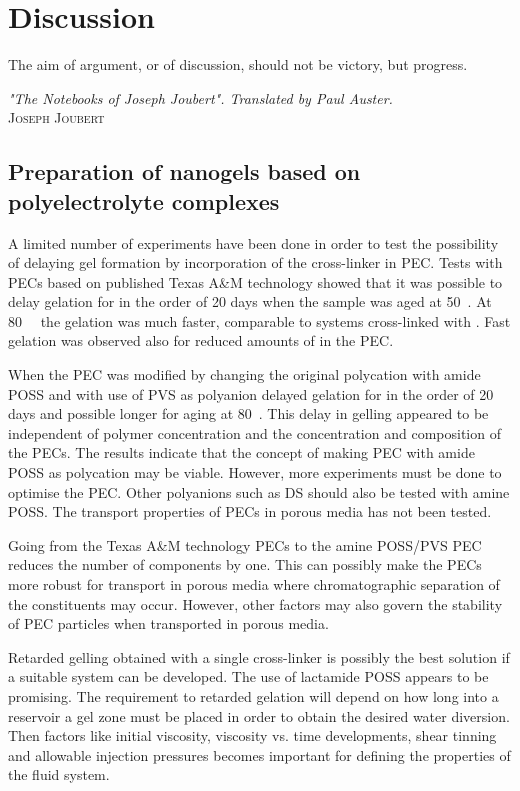 \chapter{Discussion} \label{chap:experimental}
\vspace*{\fill}
\epigraph{The aim of argument, or of discussion, should not be victory, but progress.}%
{\textit{"The Notebooks of Joseph Joubert". Translated by Paul Auster.}\\ \textsc{Joseph Joubert}}
\clearpage{\thispagestyle{empty}\cleardoublepage}
\section{Preparation of nanogels based on polyelectrolyte complexes}
A limited number of experiments have been done in order to test the possibility of delaying gel formation by incorporation of the cross-linker in PEC. Tests with PECs based on published Texas A\&M technology showed that it was possible to delay gelation for in the order of 20 days when the sample was aged at 50~\celsius. At 80~\celsius~ the gelation was much faster, comparable to systems cross-linked with . Fast gelation was observed also for reduced amounts of  in the PEC.

When the PEC was modified by changing the original polycation with amide POSS and with use of PVS as polyanion delayed gelation for in the order of 20 days and possible longer for aging at 80~\celsius. This delay in gelling appeared to be independent of polymer concentration and the concentration and composition of the PECs. The results indicate that the concept of making PEC with amide POSS as polycation may be viable. However, more experiments must be done to optimise the PEC. Other polyanions such as DS should also be tested with amine POSS. The transport properties of PECs in porous media has not been tested.

Going from the Texas A\&M technology PECs to the amine POSS/PVS PEC reduces the number of components by one. This can possibly make the PECs more robust for transport in porous media where chromatographic separation of the constituents may occur. However, other factors may also govern the stability of PEC particles when transported in porous media.

Retarded gelling obtained with a single cross-linker is possibly the best solution if a suitable system can be developed. The use of lactamide POSS appears to be promising. The requirement to retarded gelation will depend on how long into a reservoir a gel zone must be placed in order to obtain the desired water diversion. Then factors like initial viscosity, viscosity vs. time developments, shear tinning and allowable injection pressures becomes important for defining the properties of the fluid system.

